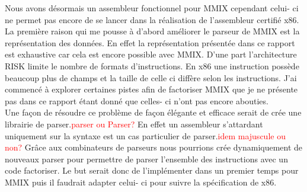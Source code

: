 \documentclass {article}
\theoremstyle{definition}
\theoremstyle{remark}
\newcommand{\todo}[1]{\textcolor{red}{#1}}
\begin{document}
Nous avons désormais un assembleur fonctionnel pour MMIX cependant celui- ci ne permet pas encore de se lancer
dans la réalisation de l'assembleur certifié x86.\\
La première raison qui me pousse à d'abord améliorer le parseur de MMIX est la représentation des données.
En effet la représentation présentée dans ce rapport est exhaustive car cela est encore possible avec
MMIX. D'une part l'architecture RISK limite le nombre de formats d'instructions. En x86 une instruction possède
beaucoup plus de champs et la taille de celle ci diffère selon les instructions. J'ai commencé à explorer certaines
pistes afin de factoriser MMIX que je ne présente pas dans ce rapport étant donné que celles- ci n'ont pas encore abouties.
\\
Une façon de résoudre ce problème de façon élégante et efficace serait de crée une librairie de parser.\todo{parser ou Parser?}
En effet un assembleur s'attardant uniquement sur la syntaxe est un cas particulier de parser.\todo{idem majuscule ou non?}
Grâce aux combinateurs de parseurs nous pourrions crée dynamiquement de nouveaux parser pour
permettre de parser l'ensemble des instructions avec un code factoriser. Le but serait donc de l'implémenter
dans un premier temps pour MMIX puis il faudrait adapter celui- ci pour suivre la spécification de x86.

\end{document}
